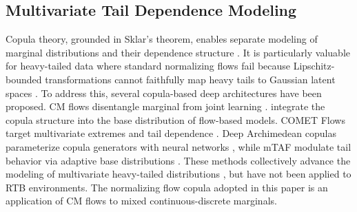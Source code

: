 \documentclass[sigconf, anonymous, review]{acmart}
\begin{document}
\subsection{Multivariate Tail Dependence Modeling}
Copula theory, grounded in Sklar's theorem, enables separate modeling of marginal distributions and their dependence structure \cite{joe2014dependence}. It is particularly valuable for heavy-tailed data where standard normalizing flows fail because Lipschitz-bounded transformations cannot faithfully map heavy tails to Gaussian latent spaces \cite{jaini2020tails}. To address this, several copula-based deep architectures have been proposed.
CM flows disentangle marginal from joint learning \cite{wiese2019copula}. \cite{laszkiewicz2021copulabased} integrate the copula structure into the base distribution of flow-based models. COMET Flows target multivariate extremes and tail dependence \cite{COMETFlows}. Deep Archimedean copulas parameterize copula generators with neural networks \cite{ling2020deep}, while mTAF modulate tail behavior via adaptive base distributions \cite{laszkiewicz2022marginal}. These methods collectively advance the modeling of multivariate heavy-tailed distributions \cite{resnick2007heavy}, but have not been applied to RTB environments.
The normalizing flow copula adopted in this paper is an application of CM flows to mixed continuous-discrete marginals.
\end{document}
